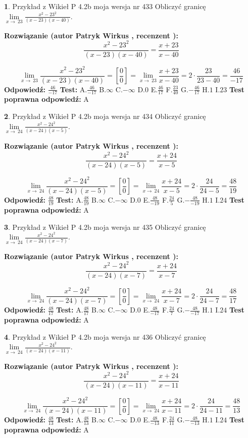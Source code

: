 \documentclass[12pt, a4paper]{article}
\theoremstyle{definition} %
\newtheorem{zad}{}
\newcommand{\zadStart}[1]{\begin{zad}#1\newline}
\newcommand{\zadStop}{\end{zad}}
\newcommand{\rozwStart}[2]{\noindent \textbf{Rozwiązanie (autor #1 , recenzent #2): }\newline}
\newcommand{\rozwStop}{\newline}
\newcommand{\odpStart}{\noindent \textbf{Odpowiedź:}\newline}
\newcommand{\odpStop}{\newline}
\newcommand{\testStart}{\noindent \textbf{Test:}\newline}
\newcommand{\testStop}{\newline}
\newcommand{\kluczStart}{\noindent \textbf{Test poprawna odpowiedź:}\newline}
\newcommand{\kluczStop}{\newline}
\begin{document}
\zadStart{Przykład z Wikieł P 4.2b moja wersja nr 433}
Obliczyć granicę $\lim\limits_{x\to\ 23}\frac{x^{2}-23^{2}}{(x-23)(x-40)}$.
\zadStop
\rozwStart{Patryk Wirkus}{}
$$\frac{x^{2}-23^{2}}{(x-23)(x-40)}=\frac{x+23}{x-40}$$

$$\lim\limits_{x\to\ 23}\frac{x^{2}-23^{2}}{(x-23)(x-40)}=[\frac{0}{0}]=\lim\limits_{x\to\ 23}\frac{x+23}{x-40}=2 \cdot \frac{23}{23-40} = \frac{46}{-17}$$
\rozwStop
\odpStart
$\frac{46}{-17}$
\odpStop
\testStart
A.$\frac{46}{-17}$
B.$\infty$
C.$-\infty$
D.$0$
E.$\frac{46}{17}$
F.$\frac{23}{40}$
G.$-\frac{46}{17}$
H.$1$
I.$23$
\testStop
\kluczStart
A
\kluczStop



\zadStart{Przykład z Wikieł P 4.2b moja wersja nr 434}
Obliczyć granicę $\lim\limits_{x\to\ 24}\frac{x^{2}-24^{2}}{(x-24)(x-5)}$.
\zadStop
\rozwStart{Patryk Wirkus}{}
$$\frac{x^{2}-24^{2}}{(x-24)(x-5)}=\frac{x+24}{x-5}$$

$$\lim\limits_{x\to\ 24}\frac{x^{2}-24^{2}}{(x-24)(x-5)}=[\frac{0}{0}]=\lim\limits_{x\to\ 24}\frac{x+24}{x-5}=2 \cdot \frac{24}{24-5} = \frac{48}{19}$$
\rozwStop
\odpStart
$\frac{48}{19}$
\odpStop
\testStart
A.$\frac{48}{19}$
B.$\infty$
C.$-\infty$
D.$0$
E.$\frac{48}{-19}$
F.$\frac{24}{5}$
G.$-\frac{48}{-19}$
H.$1$
I.$24$
\testStop
\kluczStart
A
\kluczStop



\zadStart{Przykład z Wikieł P 4.2b moja wersja nr 435}
Obliczyć granicę $\lim\limits_{x\to\ 24}\frac{x^{2}-24^{2}}{(x-24)(x-7)}$.
\zadStop
\rozwStart{Patryk Wirkus}{}
$$\frac{x^{2}-24^{2}}{(x-24)(x-7)}=\frac{x+24}{x-7}$$

$$\lim\limits_{x\to\ 24}\frac{x^{2}-24^{2}}{(x-24)(x-7)}=[\frac{0}{0}]=\lim\limits_{x\to\ 24}\frac{x+24}{x-7}=2 \cdot \frac{24}{24-7} = \frac{48}{17}$$
\rozwStop
\odpStart
$\frac{48}{17}$
\odpStop
\testStart
A.$\frac{48}{17}$
B.$\infty$
C.$-\infty$
D.$0$
E.$\frac{48}{-17}$
F.$\frac{24}{7}$
G.$-\frac{48}{-17}$
H.$1$
I.$24$
\testStop
\kluczStart
A
\kluczStop



\zadStart{Przykład z Wikieł P 4.2b moja wersja nr 436}
Obliczyć granicę $\lim\limits_{x\to\ 24}\frac{x^{2}-24^{2}}{(x-24)(x-11)}$.
\zadStop
\rozwStart{Patryk Wirkus}{}
$$\frac{x^{2}-24^{2}}{(x-24)(x-11)}=\frac{x+24}{x-11}$$

$$\lim\limits_{x\to\ 24}\frac{x^{2}-24^{2}}{(x-24)(x-11)}=[\frac{0}{0}]=\lim\limits_{x\to\ 24}\frac{x+24}{x-11}=2 \cdot \frac{24}{24-11} = \frac{48}{13}$$
\rozwStop
\odpStart
$\frac{48}{13}$
\odpStop
\testStart
A.$\frac{48}{13}$
B.$\infty$
C.$-\infty$
D.$0$
E.$\frac{48}{-13}$
F.$\frac{24}{11}$
G.$-\frac{48}{-13}$
H.$1$
I.$24$
\testStop
\kluczStart
A
\kluczStop
\end{document}
